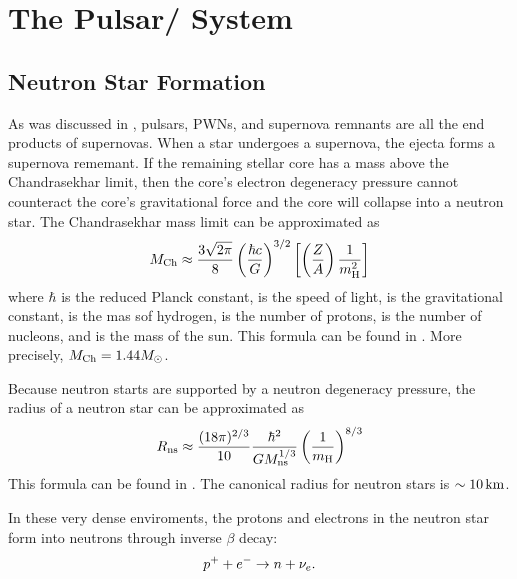 \section{The Pulsar/ System}

\subsection{Neutron Star Formation}

As was discussed in , pulsars, 
\acp{PWN},
and supernova remnants are all the end products of supernovas.  When a
star undergoes a supernova, the ejecta forms a supernova rememant.  If the
remaining stellar core has a mass above the Chandrasekhar limit,
then the core's electron degeneracy pressure cannot counteract the core's
gravitational force and the core will collapse into a neutron star.
The Chandrasekhar mass limit can be
approximated as \citep{chandrasekhar_1931_maximum-ideal}
\begin{equation}
  M_\text{Ch} \approx 
  \frac{3\sqrt{2\pi}}{8}
  \left(\frac{\hbar c}{G}\right)^{3/2}
  \left[
  \left(\frac{Z}{A}\right)
  \frac{1}{m_\text{H}^2}
  \right]
\end{equation}
where $\hbar$ is the reduced Planck constant, \speedoflight is the
speed of light, \gravitationalconstant is the gravitational constant,
\MassHydrogen is the mas sof hydrogen, \NumberProtons is the
number of protons, \NumberNucleons is the number of nucleons, and
\solarmass is the mass of the sun.  This formula can be found in
\citep{carroll_2006_introduction-modern}.
More precisely, $M_\text{Ch} = 1.44 M_{\odot}$.

Because neutron starts are supported by a
neutron degeneracy pressure,
the radius of a neutron star can be approximated as
\begin{equation}
  R_\text{ns} \approx \frac{(18 \pi)^{2/3}}{10}
  \frac{\hbar^2}{G M_\text{ns}^{1/3}}
  \left(\frac{1}{m_\text{H}}\right)^{8/3}
\end{equation}
This formula can be found in \citep{carroll_2006_introduction-modern}.
The canonical radius for neutron stars is $\sim 10\,\text{km}$.

In these very dense enviroments, the protons and electrons in the neutron
star form into neutrons through inverse $\beta$ decay:
\begin{equation}
  p^+ + e^- 
  \rightarrow n + \nu_e.
\end{equation}

